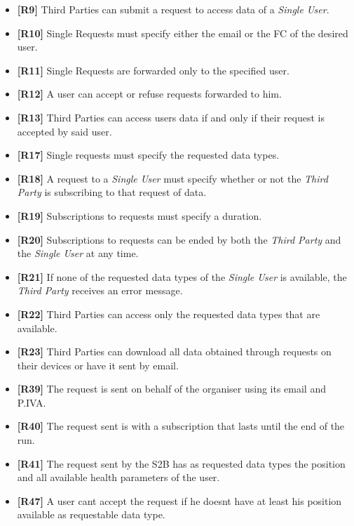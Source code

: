 \documentclass[titlepage]{article}
\begin{document}
	\begin{itemize}
		\item {\bf [R9]} Third Parties can submit a request to access data of a {\it Single User}. 
		\item {\bf [R10]} Single Requests must specify either the email or the FC of the desired user.
		\item {\bf [R11]} Single Requests are forwarded only to the specified user.
		\item {\bf [R12]} A user can accept or refuse requests forwarded to him. 
		\item {\bf [R13]} Third Parties can access user\textsc{}s data if and only if their request is accepted by said user. 
		\item {\bf [R17]} Single requests must specify the requested data types. 
		\item {\bf [R18]} A request to a {\it Single User} must specify whether or not the {\it Third Party} is subscribing to that request of data.
		\item {\bf [R19]} Subscriptions to requests must specify a duration.
		\item {\bf [R20]} Subscriptions to requests can be ended by both the {\it Third Party} and the {\it Single User} at any time.
		\item {\bf [R21]} If none of the requested data types of the {\it Single User} is available, the {\it Third Party} receives an error message.
		\item {\bf [R22]} Third Parties can access only the requested data types that are available.
		\item {\bf [R23]} Third Parties can download all data obtained through requests on their devices or have it sent by email.
		\item {\bf [R39]} The request is sent on behalf of the organiser using its email and P.IVA.
		\item {\bf [R40]} The request sent is with a subscription that lasts until the end of the run.
		\item {\bf [R41]} The request sent by the S2B has as requested data types the position and all available health parameters of the user.
		\item {\bf [R47]} A user can\textsc{}t accept the request if he doesn\textsc{}t have at least his position available as requestable data type.
	\end{itemize}	
	
\end{document}
